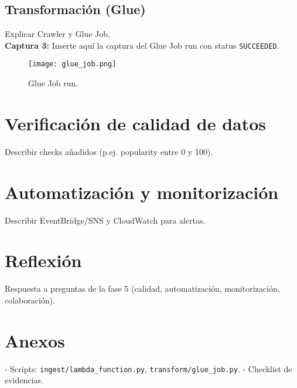 \documentclass[11pt,a4paper]{article}
\begin{document}
\subsection{Transformación (Glue)}
Explicar Crawler y Glue Job. \\
\textbf{Captura 3:} Inserte aquí la captura del Glue Job run con status \texttt{SUCCEEDED}.
\begin{figure}[H]
\centering
\texttt{[image: glue\_job.png]}
\caption{Glue Job run.}
\end{figure}

\section{Verificación de calidad de datos}
Describir checks añadidos (p.ej. popularity entre 0 y 100).

\section{Automatización y monitorización}
Describir EventBridge/SNS y CloudWatch para alertas.

\section{Reflexión}
Respuesta a preguntas de la fase 5 (calidad, automatización, monitorización, colaboración).

\section{Anexos}
- Scripts: \texttt{ingest/lambda_function.py}, \texttt{transform/glue_job.py}.
- Checklist de evidencias.
\end{document}
